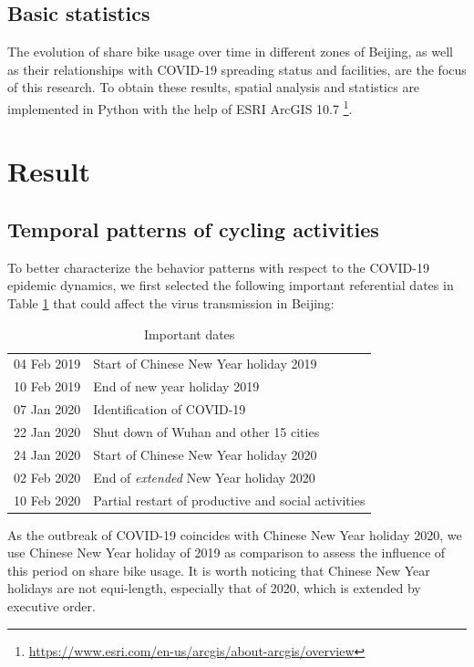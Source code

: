 \documentclass[preprints,article,accept,moreauthors,pdftex]{Definitions/mdpi}
\begin{document}
\subsection{Basic statistics}
The evolution of share bike usage over time in different zones of Beijing, as well as their relationships with COVID-19 spreading status and facilities, are the focus of this research.
To obtain these results, spatial analysis and statistics are implemented in Python with the help of ESRI ArcGIS 10.7 \footnote{\url{https://www.esri.com/en-us/arcgis/about-arcgis/overview}}. 

\section{Result}

\subsection{Temporal patterns of cycling activities}
To better characterize the behavior patterns with respect to the COVID-19 epidemic dynamics, we first selected the following important referential dates in Table \ref{tab:important_dates} that could affect the virus transmission in Beijing: 

\begin{table}[ht]
    \centering
    \begin{tabular}{ll}
    04 Feb 2019 & Start of Chinese New Year holiday 2019\\
    10 Feb 2019 & End of new year holiday 2019\\
    07 Jan 2020 & Identification of COVID-19\\
    22 Jan 2020 & Shut down of Wuhan and other 15 cities\\
    24 Jan 2020 & Start of Chinese New Year holiday 2020\\
    02 Feb 2020 & End of \textit{extended} New Year holiday 2020\\
    10 Feb 2020 & Partial restart of productive and social activities
    \end{tabular}
    \caption{Important dates}
    \label{tab:important_dates}
\end{table}

As the outbreak of COVID-19 coincides with Chinese New Year holiday 2020, we use Chinese New Year holiday of 2019 as comparison to assess the influence of this period on share bike usage.
It is worth noticing that Chinese New Year holidays are not equi-length, especially that of 2020, which is extended by executive order.
\end{document}
